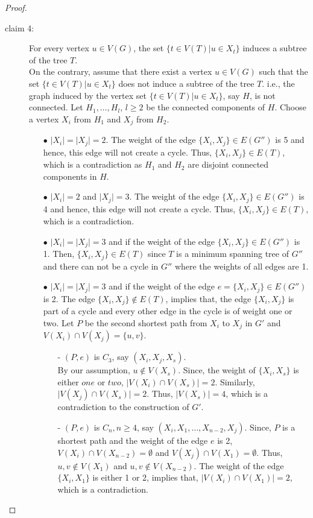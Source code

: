 \documentclass[runningheads]{llncs}
\begin{document}
\begin{proof}
\begin{description}
\item[claim 4:] For every vertex $u \in V(G)$, the set $\{ t \in V(T)\vert u \in X_t \}$ induces a subtree of the tree $T$.\\
On the contrary, assume that there exist a vertex $u \in V(G)$ such that the set $\{ t \in V(T)\vert u \in X_t \}$ does not induce a subtree of the tree $T$. i.e., the graph induced by the vertex set $\{ t \in V(T)\vert u \in X_t \}$, say $H$, is not connected. Let $H_1,\ldots, H_l$, $l \geq 2$ be the connected components of $H$. Choose a vertex $X_i$ from $H_1$ and $X_j$ from $H_2$. 
\begin{itemize}
\item[$\bullet$] $\vert X_i \vert = \vert X_j \vert = 2$. The weight of the edge $\{X_i, X_j\} \in E(G'')$ is 5 and hence, this edge will not create a cycle. Thus, $\{X_i, X_j\} \in E(T)$, which is a contradiction as $H_1$ and $H_2$ are disjoint connected components in $H$.
\item[$\bullet$] $\vert X_i \vert = 2$ and $\vert X_j \vert = 3$. The weight of the edge $\{X_i, X_j\} \in E(G'')$ is 4 and hence, this edge will not create a cycle. Thus, $\{X_i, X_j\} \in E(T)$, which is a contradiction.
\item[$\bullet$] $\vert X_i \vert = \vert X_j \vert = 3$ and if the weight of the edge $\{X_i, X_j\} \in E(G'')$ is 1. Then, $\{X_i, X_j\} \in E(T)$ since $T$ is a minimum spanning tree of $G''$ and there can not be a cycle in $G''$ where the weights of all edges are 1.
 
\item[$\bullet$] $\vert X_i \vert = \vert X_j \vert = 3$ and if the weight of the edge $e = \{X_i, X_j\} \in E(G'')$ is 2. The edge $\{X_i, X_j\} \notin E(T)$, implies that, the edge $\{X_i, X_j\}$ is part of a cycle and every other edge in the cycle is of weight one or two. Let $P$ be the second shortest path from $X_i$ to $X_j$ in $G'$ and $V(X_i) \cap V(X_j) = \{u,v\}$. 
\begin{itemize}
\item[-] $(P,e)$ is $C_3$, say $(X_i,X_j,X_s)$. \\ By our assumption, $u \notin V(X_s)$. Since, the weight of $\{X_i,X_s\}$ is either $one$ or $two$, $\vert V(X_i) \cap V(X_s)\vert = 2$. Similarly,  $\vert V(X_j) \cap V(X_s)\vert = 2$. Thus, $\vert  V(X_s)\vert = 4$, which is a contradiction to the construction of $G'$.
\item[-] $(P,e)$ is $C_n, n \geq 4$, say $(X_i,X_{1},\ldots, X_{n-2},X_j)$. Since, $P$ is a shortest path and the weight of the edge $e$ is 2, $V(X_i) \cap V(X_{n-2}) = \emptyset$ and $V(X_j) \cap V(X_1) = \emptyset$. Thus, $u,v \notin V(X_1)$ and $u,v \notin V(X_{n-2})$. The weight of the edge $\{X_i,X_1\}$ is either 1 or 2, implies that, $\vert V(X_i) \cap V(X_1)\vert = 2$, which is a contradiction.
\end{itemize}



\end{itemize}
\end{description}
\end{proof}
\end{document}

